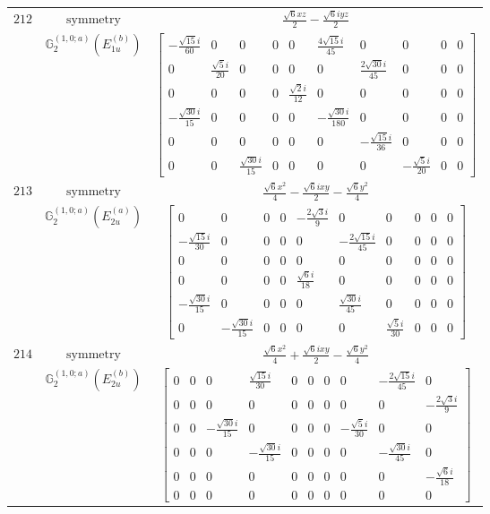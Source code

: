 \documentclass[fleqn,8pt,landscape]{jsarticle}
\begin{document}
\begin{longtable}{ccc}
$ 212 $ & $ \text{symmetry} $ & $ \frac{\sqrt{6} x z}{2} - \frac{\sqrt{6} i y z}{2} $ \\
$  $ & $ \mathbb{G}_{2}^{(1,0;a)}(E_{1u}^{(b)}) $ & $ \begin{bmatrix} - \frac{\sqrt{15} i}{60} & 0 & 0 & 0 & 0 & \frac{4 \sqrt{15} i}{45} & 0 & 0 & 0 & 0 \\ 0 & \frac{\sqrt{5} i}{20} & 0 & 0 & 0 & 0 & \frac{2 \sqrt{30} i}{45} & 0 & 0 & 0 \\ 0 & 0 & 0 & 0 & \frac{\sqrt{2} i}{12} & 0 & 0 & 0 & 0 & 0 \\ - \frac{\sqrt{30} i}{15} & 0 & 0 & 0 & 0 & - \frac{\sqrt{30} i}{180} & 0 & 0 & 0 & 0 \\ 0 & 0 & 0 & 0 & 0 & 0 & - \frac{\sqrt{15} i}{36} & 0 & 0 & 0 \\ 0 & 0 & \frac{\sqrt{30} i}{15} & 0 & 0 & 0 & 0 & - \frac{\sqrt{5} i}{20} & 0 & 0 \end{bmatrix} $ \\ \hline
$ 213 $ & $ \text{symmetry} $ & $ \frac{\sqrt{6} x^{2}}{4} - \frac{\sqrt{6} i x y}{2} - \frac{\sqrt{6} y^{2}}{4} $ \\
$  $ & $ \mathbb{G}_{2}^{(1,0;a)}(E_{2u}^{(a)}) $ & $ \begin{bmatrix} 0 & 0 & 0 & 0 & - \frac{2 \sqrt{3} i}{9} & 0 & 0 & 0 & 0 & 0 \\ - \frac{\sqrt{15} i}{30} & 0 & 0 & 0 & 0 & - \frac{2 \sqrt{15} i}{45} & 0 & 0 & 0 & 0 \\ 0 & 0 & 0 & 0 & 0 & 0 & 0 & 0 & 0 & 0 \\ 0 & 0 & 0 & 0 & \frac{\sqrt{6} i}{18} & 0 & 0 & 0 & 0 & 0 \\ - \frac{\sqrt{30} i}{15} & 0 & 0 & 0 & 0 & \frac{\sqrt{30} i}{45} & 0 & 0 & 0 & 0 \\ 0 & - \frac{\sqrt{30} i}{15} & 0 & 0 & 0 & 0 & \frac{\sqrt{5} i}{30} & 0 & 0 & 0 \end{bmatrix} $ \\ \hline
$ 214 $ & $ \text{symmetry} $ & $ \frac{\sqrt{6} x^{2}}{4} + \frac{\sqrt{6} i x y}{2} - \frac{\sqrt{6} y^{2}}{4} $ \\
$  $ & $ \mathbb{G}_{2}^{(1,0;a)}(E_{2u}^{(b)}) $ & $ \begin{bmatrix} 0 & 0 & 0 & \frac{\sqrt{15} i}{30} & 0 & 0 & 0 & 0 & - \frac{2 \sqrt{15} i}{45} & 0 \\ 0 & 0 & 0 & 0 & 0 & 0 & 0 & 0 & 0 & - \frac{2 \sqrt{3} i}{9} \\ 0 & 0 & - \frac{\sqrt{30} i}{15} & 0 & 0 & 0 & 0 & - \frac{\sqrt{5} i}{30} & 0 & 0 \\ 0 & 0 & 0 & - \frac{\sqrt{30} i}{15} & 0 & 0 & 0 & 0 & - \frac{\sqrt{30} i}{45} & 0 \\ 0 & 0 & 0 & 0 & 0 & 0 & 0 & 0 & 0 & - \frac{\sqrt{6} i}{18} \\ 0 & 0 & 0 & 0 & 0 & 0 & 0 & 0 & 0 & 0 \end{bmatrix} $ \\ \hline

\end{longtable}
\end{document}
